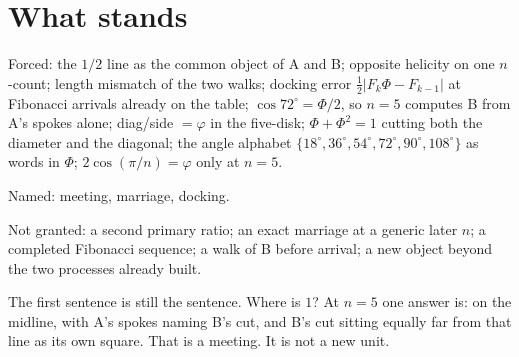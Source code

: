 \documentclass[10pt,a4paper]{article}
\theoremstyle{plain}
\theoremstyle{definition}
\begin{document}
\section{What stands}

Forced:
the $1/2$ line as the common object of A and B;
opposite helicity on one $n$-count;
length mismatch of the two walks;
docking error $\tfrac12|F_k\Phi-F_{k-1}|$ at Fibonacci arrivals already on the table;
$\cos72^{\circ}=\Phi/2$, so $n=5$ computes B from A's spokes alone;
diag/side $=\varphi$ in the five-disk;
$\Phi+\Phi^{2}=1$ cutting both the diameter and the diagonal;
the angle alphabet $\{18^{\circ},36^{\circ},54^{\circ},72^{\circ},90^{\circ},108^{\circ}\}$ as words in $\Phi$;
$2\cos(\pi/n)=\varphi$ only at $n=5$.

Named:
meeting, marriage, docking.

Not granted:
a second primary ratio;
an exact marriage at a generic later $n$;
a completed Fibonacci sequence;
a walk of B before arrival;
a new object beyond the two processes already built.

The first sentence is still the sentence.
Where is $1$?
At $n=5$ one answer is: on the midline, with A's spokes naming B's cut, and B's cut sitting equally far from that line as its own square.
That is a meeting.
It is not a new unit.
\end{document}
